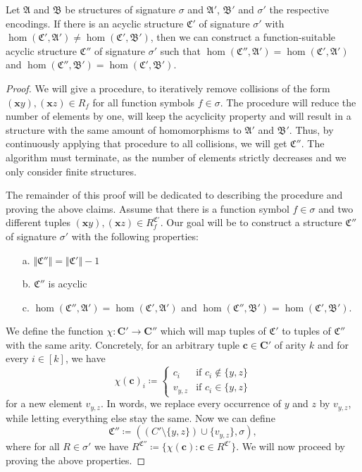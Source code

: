 \begin{lemma}
	Let $\mathfrak A$ and $\mathfrak B$ be structures of signature $\sigma$ and $\mathfrak A'$, $\mathfrak B'$ and $\sigma'$ the respective encodings.
	If there is an acyclic structure $\mathfrak C'$ of signature $\sigma'$ with $\hom(\mathfrak C',\mathfrak A')\neq\hom(\mathfrak C',\mathfrak B')$, then we can construct a function-suitable acyclic structure $\mathfrak C''$ of signature $\sigma'$ such that $\hom(\mathfrak C'',\mathfrak A')=\hom(\mathfrak C',\mathfrak A')$ and $\hom(\mathfrak C'',\mathfrak B')=\hom(\mathfrak C',\mathfrak B')$.
\end{lemma}
\begin{proof}
	We will give a procedure, to iteratively remove collisions of the form $(\mathbf x y),(\mathbf x z)\in R_f$ for all function symbols $f\in\sigma$.
	The procedure will reduce the number of elements by one, will keep the acyclicity property and will result in a structure with the same amount of homomorphisms to $\mathfrak A'$ and $\mathfrak B'$.
	Thus, by continuously applying that procedure to all collisions, we will get $\mathfrak C''$.
	The algorithm must terminate, as the number of elements strictly decreases and we only consider finite structures.
	
	The remainder of this proof will be dedicated to describing the procedure and proving the above claims.
	Assume that there is a function symbol $f\in \sigma$ and two different tuples $(\mathbf x y),(\mathbf x z)\in R_f^{\mathfrak C'}$. 
	Our goal will be to construct a structure $\mathfrak C''$ of signature $\sigma'$ with the following properties:
	\begin{itemize}
		\item[a.] $\Vert \mathfrak C'' \Vert = \Vert \mathfrak C'\Vert -1$
		\item[b.] $\mathfrak C''$ is acyclic
		\item[c.] $\hom(\mathfrak C'',\mathfrak A')=\hom(\mathfrak C',\mathfrak A')$ and $\hom(\mathfrak C'',\mathfrak B')=\hom(\mathfrak C',\mathfrak B')$.
	\end{itemize}
	We define the function $\chi : \mathbf{C'}\to\mathbf{C''}$ which will map tuples of $\mathfrak C'$ to tuples of $\mathfrak C''$ with the same arity.
	Concretely, for an arbitrary tuple $\mathbf c\in \mathbf{C'}$ of arity $k$ and for every $i\in[k]$, we have
	$$\chi(\mathbf c)_i \coloneqq \begin{cases}
		c_i & \text{if } c_i\notin \{y,z\} \\
		v_{y,z} & \text{if } c_i \in \{y,z\}
	\end{cases}$$
	for a new element $v_{y,z}$.
	In words, we replace every occurrence of $y$ and $z$ by $v_{y,z}$, while letting everything else stay the same.
	Now we can define 
	$$\mathfrak C'' \coloneqq ((C' \setminus \{y,z\})\cup \{v_{y,z}\}, \sigma),$$
	where for all $R\in\sigma'$ we have $R^{\mathfrak C''}\coloneqq \{\chi(\mathbf c) : \mathbf c\in R^{\mathfrak C'}\}$.
	We will now proceed by proving the above properties.
	

\end{proof}

